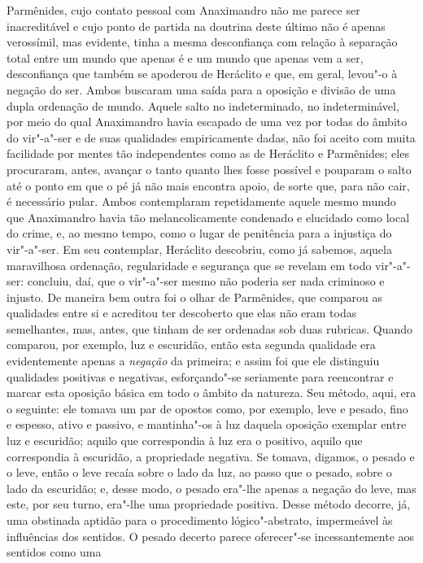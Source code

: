 Parmênides, cujo contato pessoal com Anaximandro não me parece ser
inacreditável e cujo ponto de partida na doutrina deste último não é apenas
verossímil, mas evidente, tinha a mesma desconfiança com relação à separação
total entre um mundo que apenas é e um mundo que apenas vem a ser,
desconfiança que também se apoderou de Heráclito e que, em geral, levou"-o à
negação do ser. Ambos buscaram uma saída para a oposição e divisão de uma
dupla ordenação de mundo. Aquele salto no indeterminado, no indeterminável,
por meio do qual Anaximandro havia escapado de uma vez por todas do âmbito do
vir"-a"-ser e de suas qualidades empiricamente dadas, não foi aceito com
muita facilidade por mentes tão independentes como as de Heráclito e
Parmênides; eles procuraram, antes, avançar o tanto quanto lhes fosse
possível e pouparam o salto até o ponto em que o pé já não mais encontra
apoio, de sorte que, para não cair, é necessário pular. Ambos contemplaram
repetidamente aquele mesmo mundo que Anaximandro havia tão melancolicamente
condenado e elucidado como local do crime, e, ao mesmo tempo, como o lugar de
penitência para a injustiça do vir"-a"-ser. Em seu contemplar, Heráclito
descobriu, como já sabemos, aquela maravilhosa ordenação, regularidade e
segurança que se revelam em todo vir"-a"-ser: concluiu, daí, que o
vir"-a"-ser mesmo não poderia ser nada criminoso e injusto. De maneira bem
outra foi o olhar de Parmênides, que comparou as qualidades entre si e
acreditou ter descoberto que elas não eram todas semelhantes, mas, antes, que
tinham de ser ordenadas sob duas rubricas. Quando comparou, por exemplo, luz
e escuridão, então esta segunda qualidade era evidentemente apenas a \textit{negação} 
da primeira; e assim foi que ele distinguiu qualidades positivas e
negativas, esforçando"-se seriamente para reencontrar e marcar esta oposição
básica em todo o âmbito da natureza. Seu método, aqui, era o seguinte: ele
tomava um par de opostos como, por exemplo, leve e pesado, fino e \label{eletomavaumpar} 
espesso, ativo e passivo, e mantinha"-os à luz daquela
oposição exemplar entre luz e escuridão; aquilo que correspondia à luz era o
positivo, aquilo que correspondia à escuridão, a propriedade negativa. Se
tomava, digamos, o pesado e o leve, então o leve recaía sobre o lado da luz,
ao passo que o pesado, sobre o lado da escuridão; e, desse modo, o pesado
era"-lhe apenas a negação do leve, mas este, por seu turno, era"-lhe uma
propriedade positiva. Desse método decorre, já, uma obstinada aptidão para o
procedimento lógico"-abstrato, impermeável às influências dos sentidos. O
pesado decerto parece oferecer"-se incessantemente aos sentidos como uma
